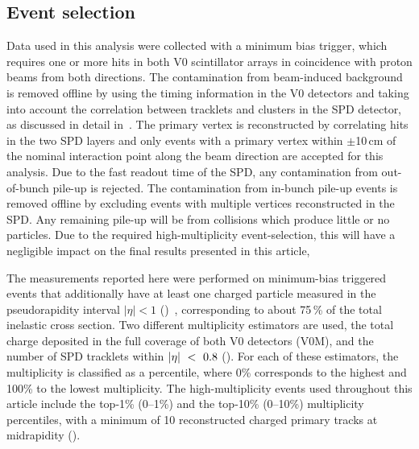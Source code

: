 \subsection{Event selection}\label{Sec:Mult}

Data used in this analysis were collected with a minimum bias trigger, which requires one or more hits in both V0 scintillator arrays in coincidence with proton beams from both directions. The contamination from beam-induced background is removed offline by using the timing information in the V0 detectors and taking into account the correlation between tracklets and clusters in the SPD detector, as discussed in detail in~\cite{ALICE2}. The primary vertex is reconstructed by correlating hits in the two SPD layers and only events with a primary vertex within $\pm$10\,cm of the nominal interaction point along the beam direction are accepted for this analysis. Due to the fast readout time of the SPD, any contamination from out-of-bunch pile-up is rejected. The contamination from in-bunch pile-up events is removed offline by excluding events with multiple vertices reconstructed in the SPD. Any remaining pile-up will be from collisions which produce little or no particles. Due to the required high-multiplicity event-selection, this will have a negligible impact on the final results presented in this article,

The measurements reported here were performed on minimum-bias triggered events that additionally have at least one charged particle measured in the pseudorapidity interval $|\eta| < 1$ (\INELgtO)~\cite{INEL}, corresponding to about 75\,\% of the total inelastic cross section. Two different multiplicity estimators are used, the total charge deposited in the full coverage of both V0 detectors (V0M), and the number of SPD tracklets within $\mbox{$\left | \eta \right |~<~0$}.8$ (\tracklet). For each of these estimators, the multiplicity is classified as a percentile, where 0\% corresponds to the highest and 100\% to the lowest multiplicity. The high-multiplicity events used throughout this article include the top-1\% (0--1\%) and the top-10\% (0--10\%) multiplicity percentiles, with a minimum of 10 reconstructed charged primary tracks at midrapidity (). 

